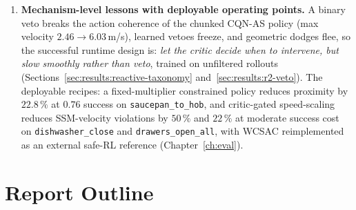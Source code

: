 \documentclass[11pt,a4paper]{report}
\newcommand{\ssm}{SSM}
\newcommand{\cqnas}{CQN-AS}
\begin{document}
\begin{enumerate}[leftmargin=2em,topsep=2pt,itemsep=2pt]
{  with a support-bound guarantee.} Because \cqnas{} is critic-only,
  the Lagrangian must be written as action selection on
  $Q_r-\lambda Q_c$ rather than as an actor update. The report also
  proves a C51 support-bound condition stating when dense safety
  shaping can be added to a distributional critic without silent
  saturation (Section~\ref{sec:method:lagrangian}).
\item \textbf{Mechanism-level lessons with deployable operating
  points.} A binary veto breaks the action coherence of the chunked
  \cqnas{} policy (max velocity $2.46 \to 6.03$\,m/s), learned vetoes
  freeze, and geometric dodges flee, so the successful runtime design
  is: \emph{let the critic decide when to intervene, but slow
  smoothly rather than veto}, trained on unfiltered rollouts
  (Sections~\ref{sec:results:reactive-taxonomy}
  and~\ref{sec:results:r2-veto}). The deployable recipes: a
  fixed-multiplier constrained policy reduces proximity by
  $22.8\,\%$ at $0.76$ success on \texttt{saucepan\_to\_hob}, and
  critic-gated speed-scaling reduces \ssm{}-velocity violations by
  $50\,\%$ and $22\,\%$ at moderate success cost on
  \texttt{dishwasher\_close} and \texttt{drawers\_open\_all}, with
  WCSAC reimplemented as an external safe-RL reference
  (Chapter~\ref{ch:eval}).
\end{enumerate}

\section{Report Outline}
\label{sec:intro:outline}
\end{document}

